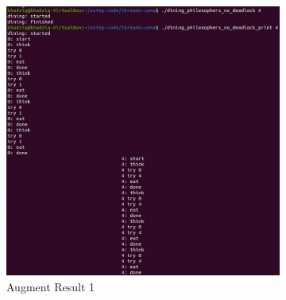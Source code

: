 \documentclass[11pt,a4paper]{article}
\begin{document}
    \begin{figure}[h]
	\centering
	\begin{subfigure}[b]{0.3\textwidth}
		\centering
		\def\svgwidth{\columnwidth}
		\includegraphics[width=1\textwidth]{Figure/dining no deadlock.png}
		\caption{Augment Result 1}
		\label{fig:aug-1}
	\end{subfigure}
	\qquad %
	\begin{subfigure}[b]{0.2\textwidth}
		\centering
		\def\svgwidth{\columnwidth}

\end{subfigure}
\end{figure}
\end{document}
